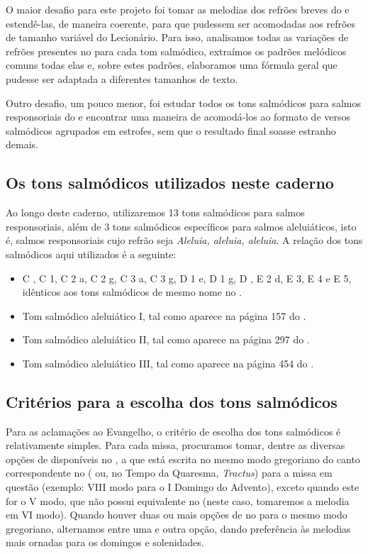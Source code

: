 O maior desafio para este projeto foi tomar as melodias dos refrões breves do {\GS} e estendê-las, de maneira coerente, para que pudessem ser acomodadas aos refrões de tamanho variável do Lecionário. Para isso, analisamos todas as variações de refrões presentes no {\GS} para cada tom salmódico, extraímos os padrões melódicos comuns todas elas e, sobre estes padrões, elaboramos uma fórmula geral que pudesse ser adaptada a diferentes tamanhos de texto.

Outro desafio, um pouco menor, foi estudar todos os tons salmódicos para salmos responsoriais do {\GS} e encontrar uma maneira de acomodá-los ao formato de versos salmódicos agrupados em estrofes, sem que o resultado final soasse estranho demais.

\subsection{Os tons salmódicos utilizados neste caderno}

Ao longo deste caderno, utilizaremos 13 tons salmódicos para salmos responsoriais, além de 3 tons salmódicos específicos para salmos aleluiáticos, isto é, salmos responsoriais cujo refrão seja \emph{Aleluia, aleluia, aleluia}. A relação dos tons salmódicos aqui utilizados é a seguinte:
\begin{itemize}
  \item C \protect\GreStar, C 1, C 2 a, C 2 g, C 3 a, C 3 g, D 1 e, D 1 g, D \protect\GreStar, E 2 d, E 3, E 4 e E 5, idênticos aos tons salmódicos de mesmo nome no {\GS}.
  \item Tom salmódico aleluiático I, tal como aparece na página 157 do {\GS}.
  \item Tom salmódico aleluiático II, tal como aparece na página 297 do {\GS}.
  \item Tom salmódico aleluiático III, tal como aparece na página 454 do {\GS}.
\end{itemize}

\subsection{Critérios para a escolha dos tons salmódicos}

Para as aclamações ao Evangelho, o critério de escolha dos tons salmódicos é relativamente simples. Para cada missa, procuramos tomar, dentre as diversas opções de {\Al} disponíveis no {\GS}, a que está escrita no mesmo modo gregoriano do canto correspondente no {\GR} ({\Al} ou, no Tempo da Quaresma, \emph{Tractus}) para a missa em questão (exemplo: VIII modo para o I Domingo do Advento), exceto quando este for o V modo, que não possui equivalente no {\GS} (neste caso, tomaremos a melodia em VI modo). Quando houver duas ou mais opções de {\Al} no {\GS} para o mesmo modo gregoriano, alternamos entre uma e outra opção, dando preferência às melodias mais ornadas para os domingos e solenidades.

